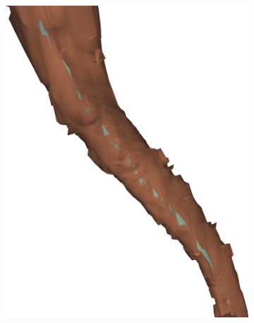 \begin{figure}[htpb]
\begin{subfigure}[b]{\mywidth}
		\includegraphics[width=\textwidth]{data/images/interpolation/linear_skel.png}
		\caption{\label{fig:skel_linear}}
	\end{subfigure}
	\hspace{3mm}
	\begin{subfigure}[b]{\mywidth}
		\centering

\end{subfigure}
\end{figure}
